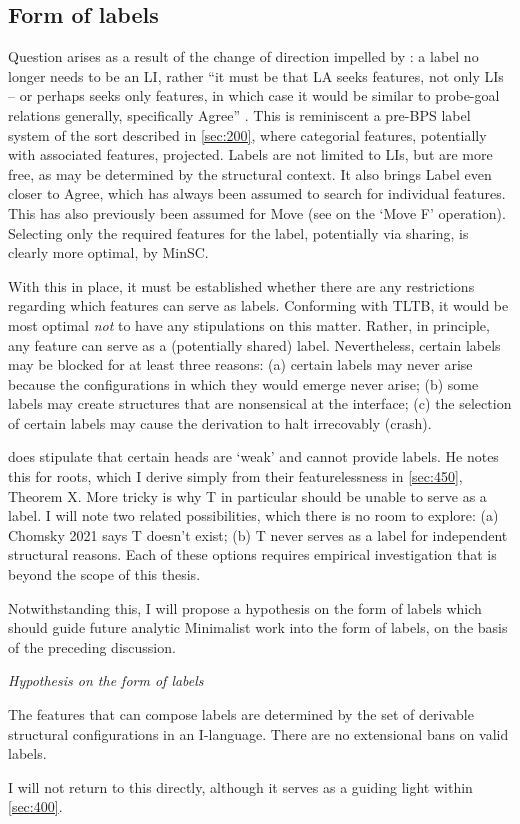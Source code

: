 \subsection{Form of labels}\label{sec:330}

Question  arises as a result of the change of direction impelled by \textcite{ChomskyN_2013}: a label no longer needs to be an LI, rather ``it must be that LA seeks features, not only LIs -- or perhaps seeks only features, in which case it would be similar to probe-goal relations generally, specifically Agree'' \parencite[45]{ChomskyN_2013}. This is reminiscent a pre-BPS label system of the sort described in \autoref{sec:200}, where categorial features, potentially with associated features, projected. Labels are not limited to LIs, but are more free, as may be determined by the structural context. It also brings Label even closer to Agree, which has always been assumed to search for individual features. This has also previously been assumed for Move (see  on the `Move F' operation). Selecting only the required features for the label, potentially via sharing, is clearly more optimal, by MinSC.

With this in place, it must be established whether there are any restrictions regarding which features can serve as labels. Conforming with TLTB, it would be most optimal \emph{not} to have any stipulations on this matter. Rather, in principle, any feature can serve as a (potentially shared) label. Nevertheless, certain labels may be blocked for at least three reasons: (a) certain labels may never arise because the configurations in which they would emerge never arise; (b) some labels may create structures that are nonsensical at the interface; (c) the selection of certain labels may cause the derivation to halt irrecovably (crash).

\textcite{ChomskyN_2015} does stipulate that certain heads are `weak' and cannot provide labels. He notes this for roots, which I derive simply from their featurelessness in \autoref{sec:450}, Theorem X. More tricky is why T in particular should be unable to serve as a label. I will note two related possibilities, which there is no room to explore: (a) Chomsky 2021 says T doesn't exist; (b) T never serves as a label for independent structural reasons. Each of these options requires empirical investigation that is beyond the scope of this thesis. 

Notwithstanding this, I will propose a hypothesis on the form of labels which should guide future analytic Minimalist work into the form of labels, on the basis of the preceding discussion.

\begin{example}
    \textit{Hypothesis on the form of labels}

    The features that can compose labels are determined by the set of derivable structural configurations in an I-language. There are no extensional bans on valid labels.
\end{example}

I will not return to this directly, although it serves as a guiding light within \autoref{sec:400}.
